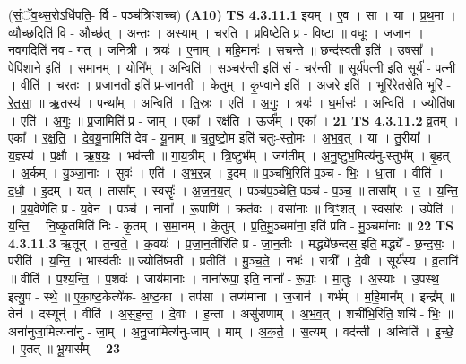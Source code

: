 \documentclass[17pt]{extarticle}
\begin{document}
                  \newline
                      (सं॒ॅव॒थ्स॒रोऽधि॑पति॒- र्वि - पञ्च॑त्रिꣳशच्च)  \textbf{(A10)} \newline \newline
                                \textbf{ TS 4.3.11.1} \newline
                  इ॒यम् । ए॒व । सा । या । प्र॒थ॒मा । व्यौच्छ॒दिति॑ वि - औच्छ॑त् । अ॒न्तः । अ॒स्याम् । च॒र॒ति॒ । प्रवि॒ष्टेति॒ प्र - वि॒ष्टा॒ ॥ व॒धूः । ज॒जा॒न॒ । न॒व॒गदिति॑ नव - गत् । जनि॑त्री । त्रयः॑ । ए॒ना॒म् । म॒हि॒मानः॑ । स॒च॒न्ते॒ ॥ छन्द॑स्वती॒ इति॑ । उ॒षसा᳚ । पेपि॑शाने॒ इति॑ । स॒मा॒नम् । योनि᳚म् । अन्विति॑ । स॒ञ्चर॑न्ती॒ इति॑ सं - चर॑न्ती ॥ सूर्य॑पत्नी॒ इति॒ सूर्य॑ - प॒त्नी॒ । वीति॑ । च॒र॒तः॒ । प्र॒जा॒न॒ती इति॑ प्र-जा॒न॒ती । के॒तुम् । कृ॒ण्वा॒ने इति॑ । अ॒जरे॒ इति॑ । भूरि॑रे॒तसेति॒ भूरि॑ - रे॒त॒सा॒ ॥ ऋ॒तस्य॑ । पन्था᳚म् । अन्विति॑ । ति॒स्रः । एति॑ । अ॒गुः॒ । त्रयः॑ । घ॒र्मासः॑ । अन्विति॑ । ज्योति॑षा । एति॑ । अ॒गुः॒ ॥ प्र॒जामिति॑ प्र - जाम् । एका᳚ । रक्ष॑ति । ऊर्ज᳚म् । एका᳚ । \textbf{  21} \newline
                  \newline
                                \textbf{ TS 4.3.11.2} \newline
                  व्र॒तम् । एका᳚ । र॒क्ष॒ति॒ । दे॒व॒यू॒नामिति॑ देव - यू॒नाम् ॥ च॒तु॒ष्टो॒म इति॑ चतुः-स्तो॒मः । अ॒भ॒व॒त् । या । तु॒रीया᳚ । य॒ज्ञ्स्य॑ । प॒क्षौ । ऋ॒ष॒यः॒ । भव॑न्ती ॥ गा॒य॒त्रीम् । त्रि॒ष्टुभ᳚म् । जग॑तीम् । अ॒नु॒ष्टुभ॒मित्य॑नु-स्तुभ᳚म् । बृ॒हत् । अ॒र्कम् । यु॒ञ्जा॒नाः । सुवः॑ । एति॑ । अ॒भ॒र॒न्न् । इ॒दम् ॥ प॒ञ्चभि॒रिति॑ प॒ञ्च - भिः॒ । धा॒ता । वीति॑ । द॒धौ॒ । इ॒दम् । यत् । तासा᳚म् । स्वसॄः᳚ । अ॒ज॒न॒य॒त् । पञ्च॑प॒ञ्चेति॒ पञ्च॑ - प॒ञ्च॒ ॥ तासा᳚म् । उ॒ । य॒न्ति॒ । प्र॒य॒वेणेति॑ प्र - य॒वेन॑ । पञ्च॑ । नाना᳚ । रू॒पाणि॑ । क्रत॑वः । वसा॑नाः ॥ त्रिꣳ॒॒शत् । स्वसा॑रः । उपेति॑ । य॒न्ति॒ । नि॒ष्कृ॒तमिति॑ निः - कृ॒तम् । स॒मा॒नम् । के॒तुम् । प्र॒ति॒मु॒ञ्चमा॑ना॒ इति॑ प्रति - मु॒ञ्चमा॑नाः ॥ \textbf{  22} \newline
                  \newline
                                \textbf{ TS 4.3.11.3} \newline
                  ऋ॒तून् । त॒न्व॒ते॒ । क॒वयः॑ । प्र॒जा॒न॒तीरिति॑ प्र - जा॒न॒तीः । मद्ध्ये॑छन्दस॒ इति॒ मद्ध्ये᳚ - छ॒न्द॒सः॒ । परीति॑ । य॒न्ति॒ । भास्व॑तीः ॥ ज्योति॑ष्मती । प्रतीति॑ । मु॒ञ्च॒ते॒ । नभः॑ । रात्री᳚ । दे॒वी । सूर्य॑स्य । व्र॒तानि॑ ॥ वीति॑ । प॒श्य॒न्ति॒ । प॒शवः॑ । जाय॑मानाः । नाना॑रूपा॒ इति॒ नाना᳚ - रू॒पाः॒ । मा॒तुः । अ॒स्याः । उ॒पस्थ॒ इत्यु॒प - स्थे॒ ॥ ए॒का॒ष्ट॒केत्ये॑क- अ॒ष्ट॒का । तप॑सा । तप्य॑माना । ज॒जान॑ । गर्भ᳚म् । म॒हि॒मान᳚म् । इन्द्र᳚म् ॥ तेन॑ । दस्यून्॑ । वीति॑ । अ॒स॒ह॒न्त॒ । दे॒वाः । ह॒न्ता । असु॑राणाम् । अ॒भ॒व॒त् । शची॑भि॒रिति॒ शचि॑ - भिः॒ ॥ अना॑नुजा॒मित्यना॑नु - जा॒म् । अ॒नु॒जामित्य॑नु-जाम् । माम् । अ॒क॒र्त॒ । स॒त्यम् । वद॑न्ती । अन्विति॑ । इ॒च्छे॒ । ए॒तत् ॥ भू॒यास᳚म् । \textbf{  23} \newline
\end{document}
